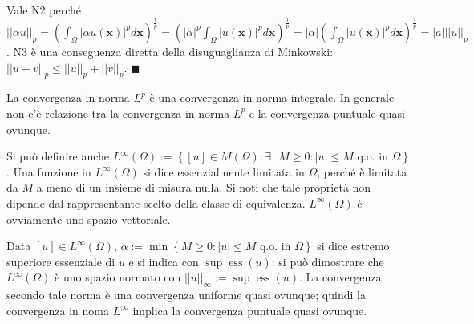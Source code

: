 \documentclass{article}
\begin{document}
Vale N2 perch\'{e} $\left\vert \left\vert \alpha u\right\vert \right\vert
_{p}=\left( \int_{\Omega }\left\vert \alpha u\left( \mathbf{x}\right)
\right\vert ^{p}d\mathbf{x}\right) ^{\frac{1}{p}}=\left( \left\vert \alpha
\right\vert ^{p}\int_{\Omega }\left\vert u\left( \mathbf{x}\right)
\right\vert ^{p}d\mathbf{x}\right) ^{\frac{1}{p}}=\left\vert \alpha
\right\vert \left( \int_{\Omega }\left\vert u\left( \mathbf{x}\right)
\right\vert ^{p}d\mathbf{x}\right) ^{\frac{1}{p}}=\left\vert a\right\vert
\left\vert \left\vert u\right\vert \right\vert _{p}$. N3 \`{e} una
conseguenza diretta della disuguaglianza di Minkowski: $\left\vert
\left\vert u+v\right\vert \right\vert _{p}\leq \left\vert \left\vert
u\right\vert \right\vert _{p}+\left\vert \left\vert v\right\vert \right\vert
_{p}$. $\blacksquare $

La convergenza in norma $L^{p}$ \`{e} una convergenza in norma integrale. In
generale non c'\`{e} relazione tra la convergenza in norma $L^{p}$ e la
convergenza puntuale quasi ovunque.

Si pu\`{o} definire anche $L^{\infty }\left( \Omega \right) :=\left\{ \left[
u\right] \in M\left( \Omega \right) :\exists \text{ }M\geq 0:\left\vert
u\right\vert \leq M\text{ q.o. in }\Omega \right\} $. Una funzione in $%
L^{\infty }\left( \Omega \right) $ si dice essenzialmente limitata in $%
\Omega $, perch\'{e} \`{e} limitata da $M$ a meno di un insieme di misura
nulla. Si noti che tale propriet\`{a} non dipende dal rappresentante scelto
della classe di equivalenza. $L^{\infty }\left( \Omega \right) $ \`{e}
ovviamente uno spazio vettoriale.

Data $\left[ u\right] \in L^{\infty }\left( \Omega \right) $, $\alpha :=\min
\left\{ M\geq 0:\left\vert u\right\vert \leq M\text{ q.o. in }\Omega
\right\} $ si dice estremo superiore essenziale di $u$ e si indica con $\sup
\operatorname{ess}\left( u\right) $: si pu\`{o} dimostrare che $L^{\infty }\left( \Omega
\right) $ \`{e} uno spazio normato con $\left\vert \left\vert u\right\vert
\right\vert _{\infty }:=\sup \operatorname{ess}\left( u\right) $. La convergenza secondo
tale norma \`{e} una convergenza uniforme quasi ovunque; quindi la
convergenza in noma $L^{\infty }$ implica la convergenza puntuale quasi
ovunque.
\end{document}
